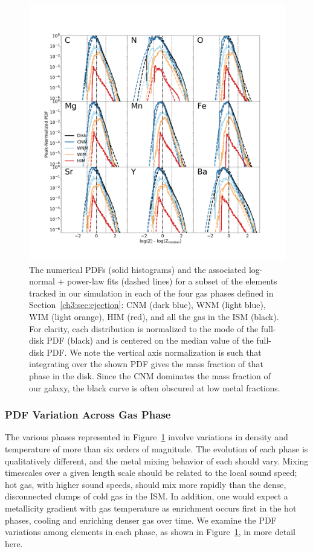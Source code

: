 \begin{figure}
\centering
\includegraphics[width=0.95\linewidth]{figures/ch3/DD0390_element_by_element}
\caption{The numerical PDFs (solid histograms) and the associated log-normal + power-law fits (dashed lines) for a subset of the elements tracked in our simulation in each of the four gas phases defined in Section~\ref{ch3:sec:ejection}: CNM (dark blue), WNM (light blue), WIM (light orange), HIM (red), and all the gas in the ISM (black). For clarity, each distribution is normalized to the mode of the full-disk PDF (black) and is centered on the median value of the full-disk PDF. We note the vertical axis normalization is such that integrating over the shown PDF gives the mass fraction of that phase in the disk. Since the CNM dominates the mass fraction of our galaxy, the black curve is often obscured at low metal fractions.}
\label{ch3:fig:log-normal}
\end{figure}

\subsubsection{PDF Variation Across Gas Phase}
\label{ch3:sec:phase-pdfs}

The various phases represented in Figure~\ref{ch3:fig:log-normal} involve variations in density and temperature of more than six orders of magnitude. The evolution of each phase is qualitatively different, and the metal mixing behavior of each should vary. Mixing timescales over a given length scale should be related to the local sound speed; hot gas, with higher sound speeds, should mix more rapidly than the dense, disconnected clumps of cold gas in the ISM. In addition, one would expect a metallicity gradient with gas temperature as enrichment occurs first in the hot phases, cooling and enriching denser gas over time. We examine the PDF variations among elements in each phase, as shown in Figure~\ref{ch3:fig:log-normal}, in more detail here.


